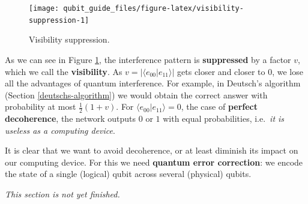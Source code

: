 \documentclass[fleqn,a4paper]{article}
\newenvironment{idea}{\everypar{\setlength{\parindent}{1.5em}}}{}
\newenvironment{todo}{\color{primary}\emph{This section is not yet finished.}}{}
\theoremstyle{definition}
\theoremstyle{definition}
\theoremstyle{definition}
\theoremstyle{definition}
\theoremstyle{remark}
\begin{document}
\begin{figure}[H]

{\centering \texttt{[image: qubit\_guide\_files/figure-latex/visibility-suppression-1]} 

}

\caption{Visibility suppression.}\label{fig:visibility-suppression}
\end{figure}

As we can see in Figure \ref{fig:visibility-suppression}, the interference pattern is \textbf{suppressed} by a factor \(v\), which we call the \textbf{visibility}.
As \(v=|\langle e_{00}|e_{11}\rangle|\) gets closer and closer to \(0\), we lose all the advantages of quantum interference.
For example, in Deutsch's algorithm (Section \ref{deutschs-algorithm}) we would obtain the correct answer with probability at most \(\frac{1}{2}(1+v)\).
For \(\langle e_{00}|e_{11}\rangle = 0\), the case of \textbf{perfect decoherence}, the network outputs \(0\) or \(1\) with equal probabilities, i.e.~\emph{it is useless as a computing device}.

\begin{idea}
It is clear that we want to avoid decoherence, or at least diminish its impact on our computing device.
For this we need \textbf{quantum error correction}: we encode the state of a single (logical) qubit across several (physical) qubits.

\end{idea}

\begin{todo}

\end{todo}
\end{document}
